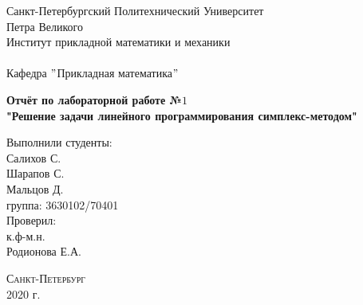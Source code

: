 \documentclass[a4]{article}
\begin{document}
	\def\contentsname{\LARGE{Содержание}}
	\thispagestyle{empty}
	\begin{center} 
		\vspace{2cm} 
		{\Large \sc Санкт-Петербургский Политехнический Университет}\\
		\vspace{2mm}
		{\Large\sc Петра Великого}\\
		\vspace{1cm}
		{\large \sc Институт прикладной математики и механики\\ 
			\vspace{0.5mm}
			\textsc{}}\\ 
		\vspace{0.5mm}
		{\large\sc Кафедра $"$Прикладная математика$"$}\\
		\vspace{15mm}
		
		
		{\sc \textbf{
			Отчёт по лабораторной работе №$1$\\
			"Решение задачи линейного программирования симплекс-методом"}
			\vspace{6mm}
			
		}
		\vspace*{2mm}
		
		
		\begin{flushleft}
			\vspace{4cm}
			\sc Выполнили студенты:\\
			\sc Салихов С.\\
			\sc Шарапов С.\\
			\sc Мальцов Д.\\
			\sc группа: 3630102/70401\\
			\vspace{1cm}
			\sc Проверил:\\
			\sc к.ф-м.н.\\
			\sc Родионова Е.А.
			\vspace{20mm}
		\end{flushleft}
	\end{center} 
	\begin{center}
		\vfill {\large\textsc{Санкт-Петербург}}\\ 
		2020 г.
	\end{center}
	
	\newpage
	\tableofcontents
	\newpage
	
	
\end{document}
